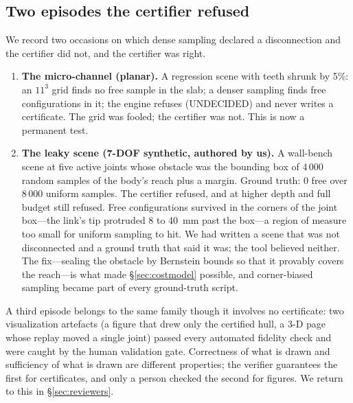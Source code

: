\documentclass[10pt,twocolumn,letterpaper]{article}
\begin{document}
\subsection{Two episodes the certifier refused}\label{sec:episodes}
We record two occasions on which dense sampling declared a disconnection and the certifier did not, and the certifier was right.
\begin{enumerate}
\item \textbf{The micro-channel (planar).} A regression scene with teeth shrunk by 5\%: an $11^3$ grid finds no free sample in the slab; a denser sampling finds free configurations in it; the engine refuses (UNDECIDED) and never writes a certificate. The grid was fooled; the certifier was not. This is now a permanent test.
\item \textbf{The leaky scene (7-DOF synthetic, authored by us).} A wall-bench scene at five active joints whose obstacle was the bounding box of 4\,000 random samples of the body's reach plus a margin. Ground truth: 0 free over 8\,000 uniform samples. The certifier refused, and at higher depth and full budget still refused. Free configurations survived in the corners of the joint box---the link's tip protruded 8 to 40~mm past the box---a region of measure too small for uniform sampling to hit. We had written a scene that was not disconnected and a ground truth that said it was; the tool believed neither. The fix---sealing the obstacle by Bernstein bounds so that it provably covers the reach---is what made \S\ref{sec:costmodel} possible, and corner-biased sampling became part of every ground-truth script.
\end{enumerate}
A third episode belongs to the same family though it involves no certificate: two visualization artefacts (a figure that drew only the certified hull, a 3-D page whose replay moved a single joint) passed every automated fidelity check and were caught by the human validation gate. Correctness of what is drawn and sufficiency of what is drawn are different properties; the verifier guarantees the first for certificates, and only a person checked the second for figures. We return to this in \S\ref{sec:reviewers}.
\end{document}
